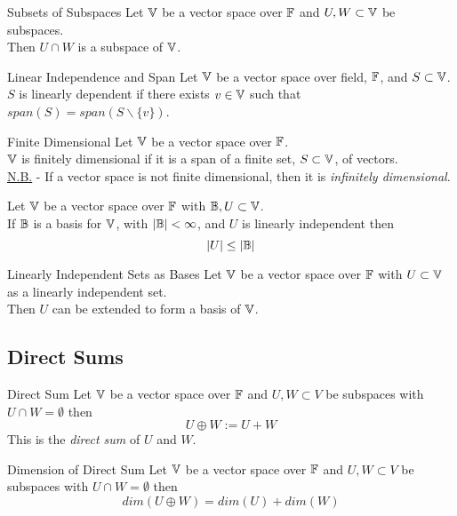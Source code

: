 \documentclass[11pt,a4paper]{article}
\begin{document}
\subtitle{Theorem 7.11 - }{Subsets of Subspaces}
Let $\mathbb{V}$ be a vector space over $\mathbb{F}$ and $U, W \subset \mathbb{V}$ be subspaces.\\
Then $U \cap W$ is a subspace of $\mathbb{V}$.\\

\subtitle{Remark 7.12 - }{Linear Independence and Span}
Let $\mathbb{V}$ be a vector space over field, $\mathbb{F}$, and $S \subset \mathbb{V}$.\\
$S$ is linearly dependent if there exists $v \in \mathbb{V}$ such that $span(S) = span(S\backslash\{v\})$.\\

\subtitle{Definition 7.13 - }{Finite Dimensional}
Let $\mathbb{V}$ be a vector space over $\mathbb{F}$.\\
$\mathbb{V}$ is finitely dimensional if it is a span of a finite set, $S \subset \mathbb{V}$, of vectors.\\
\underline{N.B.} - If a vector space is not finite dimensional, then it is \textit{infinitely dimensional}.\\

\subtitle{Theorem 7.14}{}
Let $\mathbb{V}$ be a vector space over $\mathbb{F}$ with $\mathbb{B}, U \subset \mathbb{V}$.\\
If $\mathbb{B}$ is a basis for $\mathbb{V}$, with $|\mathbb{B}| < \infty$, and $U$ is linearly independent then $$|U| \leq |\mathbb{B}|$$

\subtitle{Theorem 7.15 - }{Linearly Independent Sets as Bases}
Let $\mathbb{V}$ be a vector space over $\mathbb{F}$ with $U \subset \mathbb{V}$ as a linearly independent set.\\
Then $U$ can be extended to form a basis of $\mathbb{V}$.

\subsection{Direct Sums}

\subtitle{Definition 7.16 - }{Direct Sum}
Let $\mathbb{V}$ be a vector space over $\mathbb{F}$ and $U, W \subset V$ be subspaces with $U \cap W = \emptyset$ then
$$U \oplus W := U + W$$
This is the \textit{direct sum} of $U$ and $W$.\\

\subtitle{Theorem 7.17 - }{Dimension of Direct Sum}
Let $\mathbb{V}$ be a vector space over $\mathbb{F}$ and $U, W \subset V$ be subspaces with $U \cap W = \emptyset$ then
$$dim(U \oplus W) = dim(U) + dim(W)$$
\end{document}
